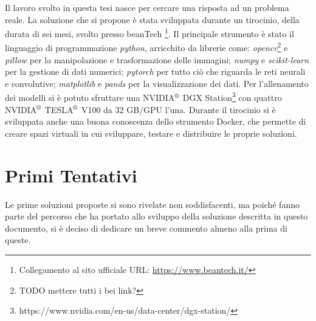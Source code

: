 Il lavoro svolto in questa tesi nasce per cercare una risposta ad un problema reale.
La soluzione che si propone è stata sviluppata durante un tirocinio, della durata di sei mesi, svolto presso beanTech \footnote{Collegamento al sito ufficiale URL: \url{https://www.beantech.it/}}.
Il principale strumento è stato il linguaggio di programmazione \textit{python}, arricchito da librerie come:
\textit{opencv}\footnote{TODO mettere tutti i bei link?} e \textit{pillow} per la manipolazione e trasformazione delle immagini; 
\textit{numpy} e \textit{scikit-learn} per la gestione di dati numerici;
\textit{pytorch} per tutto ciò che riguarda le reti neurali e convolutive;
\textit{matplotlib} e \textit{pands} per la visualizzazione dei dati.
Per l'allenamento dei modelli si è potuto sfruttare una NVIDIA$^{\text{\textregistered}}$ DGX Station\footnote{https://www.nvidia.com/en-us/data-center/dgx-station/} con quattro NVIDIA$^{\text{\textregistered}}$ TESLA$^{\text{\textregistered}}$ V100 da 32 GB/GPU l'una.
Durante il tirocinio si è sviluppata anche una buona conoscenza dello strumento Docker, che permette di creare spazi virtuali in cui sviluppare, testare e distribuire le proprie soluzioni.

\section{Primi Tentativi}
Le prime soluzioni proposte si sono rivelate non soddisfacenti, ma poiché fanno parte del percorso che ha portato allo sviluppo della soluzione descritta in questo documento, si è deciso di dedicare un breve commento almeno alla prima di queste.

